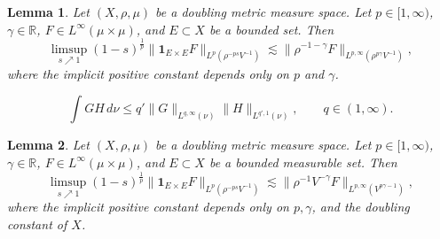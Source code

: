 \documentclass[10pt,a4paper]{amsart}
\newtheorem{lemma}{Lemma}
\newcommand{\Norm}[2]{\|#1\|_{#2}}
\begin{document}
\begin{lemma}\label{lem:BSVY963}
Let $(X,\rho,\mu)$ be a doubling metric measure space.
Let $p\in[1,\infty)$, $\gamma\in\mathbb{R}$,
$F\in L^\infty(\mu\times\mu)$, and $E\subset X$ be a bounded set. Then
\begin{equation*}
  \limsup_{s\nearrow 1}(1-s)^{\frac1p}\Norm{\mathbf{1}_{E\times
  E}F}{L^{p}(\rho^{-ps}V^{-1})}
  \lesssim\Norm{\rho^{-1-\gamma}F}{L^{p,\infty}(\rho^{p\gamma}V^{-1})},
\end{equation*}
where the implicit positive constant depends only on $p$ and $\gamma$.
\end{lemma}

\begin{equation}\label{eq:BSVY4-2}
  \int GH\,d\nu
  \leq q'\Norm{G}{L^{q,\infty}(\nu)}\Norm{H}{L^{q',1}(\nu)},\qquad q\in(1,\infty).
\end{equation}

\begin{lemma}\label{lem:BSVY105}
Let $(X,\rho,\mu)$ be a doubling metric measure space.
Let $p\in[1,\infty)$, $\gamma\in\mathbb{R}$,
$F\in L^\infty(\mu\times\mu)$, and $E\subset X$ be a bounded measurable set. Then
\begin{equation*}
  \limsup_{s\nearrow 1}(1-s)^{\frac1p}\Norm{\mathbf{1}_{E\times
  E}F}{L^{p}(\rho^{-ps}V^{-1})}
  \lesssim\Norm{\rho^{-1}V^{-\gamma}F}{L^{p,\infty}(V^{p\gamma-1})},
\end{equation*}
where the implicit positive constant depends only on $p,\gamma$, and the doubling constant
of $X$.
\end{lemma}
\end{document}
